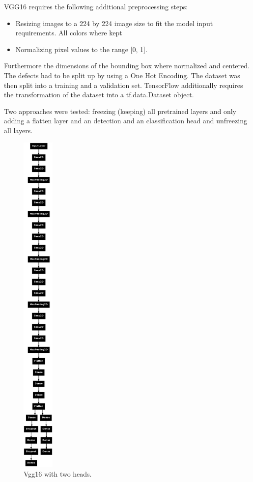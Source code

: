 \documentclass[12pt]{article}
\begin{document}
VGG16 requires the following additional preprocessing steps: 

\begin{itemize}
    \item Resizing images to a 224 by 224 image size to fit the model input requirements. All colors where kept
    \item Normalizing pixel values to the range [0, 1].  
\end{itemize}

Furthermore the dimensions of the bounding box where normalized and centered. The defects had to be split up by using a One Hot Encoding. The dataset was then split into a training and a validation set. 
TensorFlow additionally requires the transformation of the dataset into a tf.data.Dataset object.

Two approaches were tested: freezing (keeping) all pretrained layers and only adding a flatten layer and an detection and an classification head and unfreezing all layers.

\begin{figure}[h]
    \centering
    \includegraphics[width=0.14\textwidth]{./graphics/3.png}
    \caption{Vgg16 with two heads.}
\end{figure}
\end{document}
